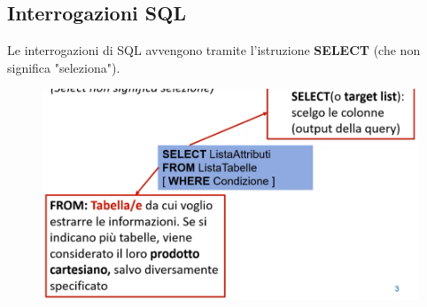 \documentclass[12pt, a4paper]{article}
\begin{document}
    \subsection{Interrogazioni SQL}
    Le interrogazioni di SQL avvengono tramite l'istruzione \textbf{SELECT} (che non significa "seleziona").
    \begin{figure}[htbp]
        \centering
        \includegraphics[scale=0.5]{select.png}
    \end{figure}
        



    
    
    
\end{document}
